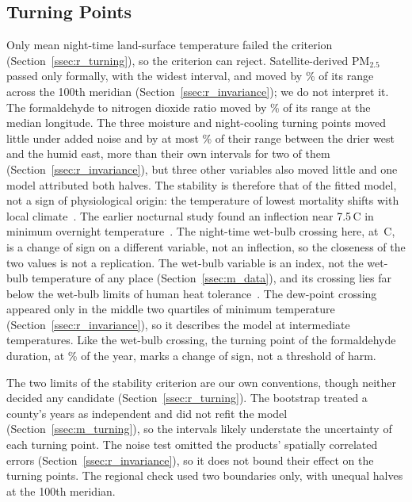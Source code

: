 \documentclass[sensors,article,submit,moreauthors,pdftex]{Definitions/mdpi}
\begin{document}
\subsection{Turning Points}
\label{ssec:d_turning}
Only mean night-time land-surface temperature
failed the criterion (Section~\ref{ssec:r_turning}), so the criterion can
reject. Satellite-derived PM$_{2.5}$ passed only formally, with the widest interval, and
moved by \RegMerPm{}\% of its range across the 100th meridian
(Section~\ref{ssec:r_invariance}); we do not interpret it. The formaldehyde to nitrogen dioxide ratio moved by \RegMedRatio{}\% of its range at the median longitude. The three
moisture and night-cooling turning points moved little under added noise and by at most
\RegMerTripletMax{}\% of their range between the drier west and the humid east, more than their
own intervals for two of them (Section~\ref{ssec:r_invariance}), but three other variables also moved little and one model attributed
both halves. The stability is therefore that of the fitted model, not a sign
of physiological origin: the temperature of lowest mortality shifts with local
climate~\cite{Curriero2002, Gasparrini2015}. The earlier
nocturnal study found an inflection near 7.5\,\textdegree C in minimum
overnight temperature~\cite{Ahmad2026night}. The night-time wet-bulb crossing
here, at \TpWet{}\,\textdegree C, is a change of sign on a different variable,
not an inflection, so the closeness of the two values is not a replication.
The wet-bulb variable is an index, not the wet-bulb temperature of any place
(Section~\ref{ssec:m_data}), and its crossing lies far below the wet-bulb
limits of human heat tolerance~\cite{Sherwood2010, Vecellio2022}. The dew-point crossing appeared
only in the middle two quartiles of minimum temperature
(Section~\ref{ssec:r_invariance}), so it describes the model at intermediate
temperatures. Like the wet-bulb crossing, the turning point of the
formaldehyde duration, at \TpHcho{}\% of the year, marks a change of sign, not
a threshold of harm.

The two limits of the
stability criterion are our own conventions, though neither decided any
candidate (Section~\ref{ssec:r_turning}). The bootstrap treated a county's years as independent and did not refit the model
(Section~\ref{ssec:m_turning}), so the intervals likely understate the uncertainty of each turning point. The
noise test omitted the products' spatially correlated errors
(Section~\ref{ssec:r_invariance}), so it does not bound their effect on the turning points. The regional check used two boundaries only, with
unequal halves at the 100th meridian.
\end{document}
